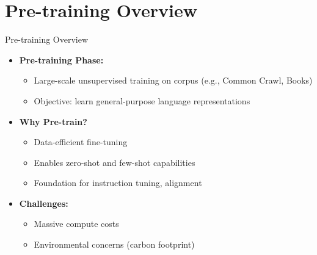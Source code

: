 \section{Pre-training Overview}
\begin{frame}{Pre-training Overview}
    \begin{itemize}
        \item \textbf{Pre-training Phase:}
        \begin{itemize}
            \item Large-scale unsupervised training on corpus (e.g., Common Crawl, Books)
            \item Objective: learn general-purpose language representations
        \end{itemize}
        \item \textbf{Why Pre-train?}
        \begin{itemize}
            \item Data-efficient fine-tuning
            \item Enables zero-shot and few-shot capabilities
            \item Foundation for instruction tuning, alignment
        \end{itemize}
        \item \textbf{Challenges:}
        \begin{itemize}
            \item Massive compute costs
            \item Environmental concerns (carbon footprint)
        \end{itemize}
    \end{itemize}
\end{frame}
